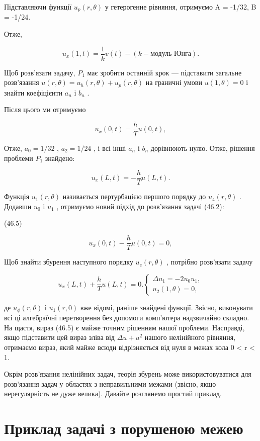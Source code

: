\documentclass[
  ukrainian,
]{article}
\begin{document}
Підставляючи функції \(u_p(r, \theta)\) у гетерогенне рівняння,
отримуємо A = -1/32, B = -1/24.

Отже,

\[
u_{x}(1, t) = \frac{1}{k} v(t) - (k - \text{модуль Юнга}).
\]

Щоб розв'язати задачу, \(P_1\) має зробити останній крок --- підставити
загальне розв'язання \(u(r, \theta) = u_h(r, \theta) + u_p(r, \theta)\)
на граничні умови \(u(1, \theta) = 0\) і знайти коефіцієнти \(a_n\) і
\(b_n\) .

Після цього ми отримуємо

\[
u_{x}(0, t) = \frac{h}{T} u(0, t),
\]

Отже, \(a_0=1/32\) , \(a_2=1/24\) , і всі інші \(a_n\) і \(b_n\)
дорівнюють нулю. Отже, рішення проблеми \(P_1\) знайдено:

\[
u_{x}(L, t) = -\frac{h}{T} u(L, t).
\]

Функція \(u_1(r, \theta)\) називається пертурбацією першого порядку до
\(u_4(r, \theta)\) . Додавши \(u_0\) і \(u_1\) , отримуємо новий підхід
до розв'язання задачі (46.2):

(46.5)

\[
u_{x}(0, t) - \frac{h}{T}u(0, t) = 0,
\]

Щоб знайти збурення наступного порядку \(u_{z}(r, \theta)\) , потрібно
розв'язати задачу

\[
u_{x}(L, t) + \frac{h}{T}u(L, t) = 0.
\begin{cases} \Delta u_{1} = -2u_{0}u_{1}, \\ u_{2}(1, \theta) = 0, \end{cases}
\]

де \(u_{\phi}(r,\theta)\) і \(u_{1}(r,0)\) вже відомі, раніше знайдені
функції. Звісно, виконувати всі ці алгебраїчні перетворення без допомоги
комп'ютера надзвичайно складно. На щастя, вираз (46.5) є майже точним
рішенням нашої проблеми. Насправді, якщо підставити цей вираз зліва від
\(\Delta u + u^{2}\) нашого нелінійного рівняння, отримаємо вираз, який
майже всюди відрізняється від нуля в межах кола 0 \textless{} r
\textless{} 1.

Окрім розв'язання нелінійних задач, теорія збурень може
використовуватися для розв'язання задач у областях з неправильними
межами (звісно, якщо нерегулярність не дуже велика). Давайте розглянемо
простий приклад.

\section{Приклад задачі з порушеною
межею}\label{ux43fux440ux438ux43aux43bux430ux434-ux437ux430ux434ux430ux447ux456-ux437-ux43fux43eux440ux443ux448ux435ux43dux43eux44e-ux43cux435ux436ux435ux44e}
\end{document}
